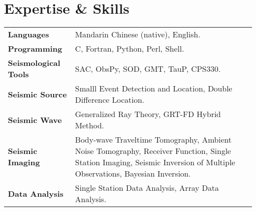 \section*{Expertise \& Skills}

\begin{tabular}{p{} p{}}
\textbf{Languages} & Mandarin Chinese (native), English. \\
\textbf{Programming} & C, Fortran, Python, Perl, Shell. \\
\textbf{Seismological Tools} & SAC, ObsPy, SOD, GMT, TauP, CPS330. \\
\textbf{Seismic Source} & Smalll Event Detection and Location, Double Difference Location. \\
\textbf{Seismic Wave} & Generalized Ray Theory, GRT-FD Hybrid Method. \\
\textbf{Seismic Imaging} & Body-wave Traveltime Tomography, Ambient Noise Tomography, Receiver Function, Single Station Imaging, Seismic Inversion of Multiple Observations, Bayesian Inversion. \\
\textbf{Data Analysis} & Single Station Data Analysis, Array Data Analysis. \\
\end{tabular}
